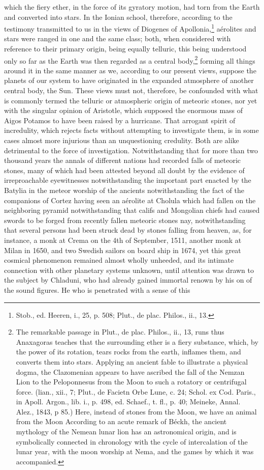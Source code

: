 which the fiery ether, in the force of its gyratory motion, had torn from the Earth and converted into stars. In the Ionian school, therefore, according to the testimony transmitted to us in the views of Diogenes of Apollonia,\footnote{Stob., ed. Heeren, i., 25, p. 508; Plut., de plac. Philos., ii., 13.} a\'{e}rolites and stars were ranged in one and the same class; both, when considered with reference to their primary origin, being equally telluric, this being understood only so far as the Earth was then regarded as a central body,\footnote{The remarkable passage in Plut., de plac. Philos., ii., 13, runs thus Anaxagoras teaches that the surrounding ether is a fiery substance, which, by the power of its rotation, tears rocks from the earth, inflames them, and converts them into stars. Applying an ancient fable to illustrate a physical dogma, the Clazomenian appears to have ascribed the fall of the Nemzan Lion to the Peloponnesus from the Moon to such a rotatory or centrifugal force. (lian., xii., 7; Plut., de Facietn Orbe Lune, c. 24; Schol. ex Cod. Paris., in Apoll. Argon., lib. i., p. 498, ed. Schaef., t. fl., p. 40; Meineke, Annal. Alez., 1843, p 85.) Here, instead of stones from the Moon, we have an animal from the Moon According to an acute remark of B\'{e}ckh, the ancient mythology of the Nemean lunar lion has an astronomical origin, and is symbolically connected in chronology with the cycle of intercalation of the lunar year, with the moon worship at Nema, and the games by which it was accompanied.} forming all things around it in the same manner as we, according to our present views, suppose the planets of our system to have originated in the expanded atmosphere of another central body, the Sun. These views must not, therefore, be confounded with what is commonly termed the telluric or atmospheric origin of meteoric stones, nor yet with the singular opinion of Aristotle, which supposed the enormous mass of Aigos Potamos to have been raised by a hurricane. That arrogant spirit of incredulity, which rejects facts without attempting to investigate them, is in some cases almost more injurious than an unquestioning credulity. Both are alike detrimental to the force of investigation. Notwithstanding that for more than two thousand years the annals of different nations had recorded falls of meteoric stones, many of which had been attested beyond all doubt by the evidence of irreproachable eyewitnesses notwithstanding the important part enacted by the Batylia in the meteor worship of the ancients notwithstanding the fact of the companions of Cortez having seen an a\'{e}rolite at Cholula which had fallen on the neighboring pyramid notwithstanding that califs and Mongolian chiefs had caused swords to be forged from recently fallen meteoric stones nay, notwithstanding that several persons had been struck dead by stones falling from heaven, as, for instance, a monk at Crema on the 4th of September, 1511, another monk at Milan in 1650, and two Swedish sailors on board ship in 1674, yet this great cosmical phenomenon remained almost wholly unheeded, and its intimate connection with other planetary systems unknown, until attention was drawn to the subject by Chladuni, who had already gained immortal renown by his on of the sound figures. He who is penetrated with a sense of this 